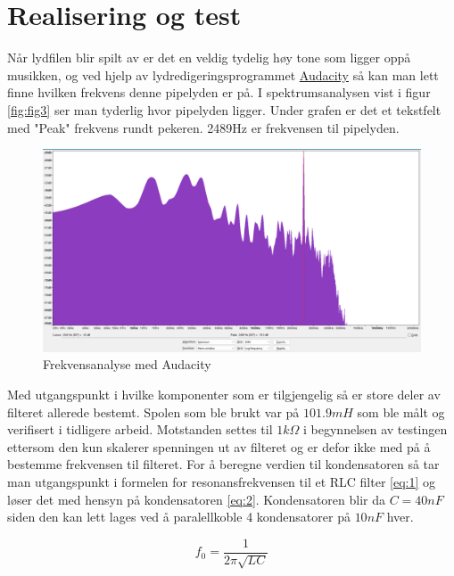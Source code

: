 \newpage
\section{Realisering og test}
\label{realiseringOgTest}


Når lydfilen blir spilt av er det en veldig tydelig høy tone som ligger oppå musikken, og ved hjelp av lydredigeringsprogrammet \href{https://www.audacityteam.org/}{Audacity} så kan man lett finne hvilken frekvens denne pipelyden er på. I spektrumsanalysen vist i figur \autoref{fig:fig3} ser man tyderlig hvor pipelyden ligger. Under grafen er det et tekstfelt med "Peak" frekvens rundt pekeren. 2489Hz er frekvensen til pipelyden. 


\begin{figure}[!h]
	\centering
	\includegraphics[width=1\textwidth]{Bilder/Audio_sectrum.png}
	\caption{Frekvensanalyse med Audacity}
	\label{fig:fig3}
\end{figure}

Med utgangspunkt i hvilke komponenter som er tilgjengelig så er store deler av filteret allerede bestemt. Spolen som ble brukt var på $101.9mH$ som ble målt og verifisert i tidligere arbeid. Motstanden settes til $1k\Omega$ i begynnelsen av testingen ettersom den kun skalerer spenningen ut av filteret og er defor ikke med på å bestemme frekvensen til filteret. For å beregne verdien til kondensatoren så tar man utgangspunkt i formelen for resonansfrekvensen til et RLC filter \autoref{eq:1} og løser det med hensyn på kondensatoren \autoref{eq:2}. Kondensatoren blir da $C = 40nF$ siden den kan lett lages ved å paralellkoble 4 kondensatorer på $10nF$ hver.

\begin{equation}
	f_0 = \frac{1}{2\pi \sqrt{LC}}
	\label{eq:1}
\end{equation}


